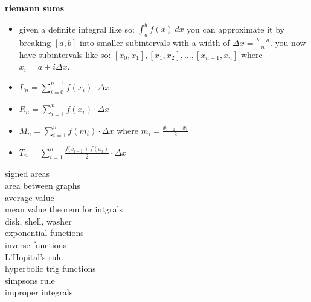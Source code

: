 \documentclass{article}
\begin{document}
\textbf{riemann sums}
	\begin{itemize}
		\item given a definite integral like so: $\int_{a}^{b}f(x)\,dx$ you can approximate it by breaking $[a, b]$ into smaller subintervals with a width of $\Delta x = \frac{b - a}{n}$. you now have subintervals like so: $[x_0, x_1], [x_1, x_2], \ldots, [x_{n-1}, x_n]$ where $x_i = a + i\Delta x$.
		\item $L_n = \sum_{i = 0}^{n - 1}f(x_i) \cdot \Delta x$ 
		\item $R_n = \sum_{i = 1}^{n}f(x_i) \cdot \Delta x$
		\item $M_n = \sum_{i = 1}^{n}f(m_i) \cdot \Delta x$ where $m_i = \frac{x_{i-1} + x_i}{2}$
		\item $T_n = \sum_{i = 1}^{n}\frac{f(x_{i - 1} + f(x_i)}{2} \cdot \Delta x$
	\end{itemize}

signed areas\\
area between graphs\\
average value\\
mean value theorem for intgrals\\
disk, shell, washer\\
exponential functions\\
inverse functions\\
L'Hopital's rule\\
hyperbolic trig functions\\
simpsons rule\\
improper integrals\\
\end{document}
